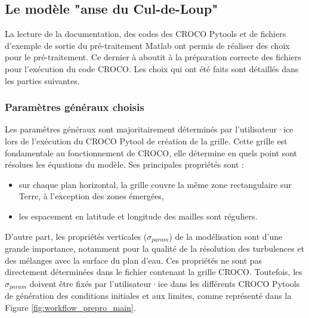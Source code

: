 \documentclass[10pt,a4paper,titlepage]{article}
\begin{document}

\subsection{Le modèle "anse du Cul-de-Loup"}
\label{sub:modele_ADCL}




La lecture de la documentation, des codes des CROCO Pytools et de fichiers d'exemple de sortie du pré-traitement Matlab ont permis de réaliser des choix pour le pré-traitement.
Ce dernier à aboutit à la préparation correcte des fichiers pour l'exécution du code CROCO.
Les choix qui ont été faits sont détaillés dans les parties suivantes.


\subsubsection{Paramètres généraux choisis}
\label{subsub:param_generaux}

Les paramètres généraux sont majoritairement déterminés par l'utilisateur·ice lors de l'exécution du CROCO Pytool de création de la grille.
Cette grille est fondamentale au fonctionnement de CROCO, elle détermine en quels point sont résolues les équations du modèle. Ses principales propriétés sont :

\begin{itemize}
    \item sur chaque plan horizontal, la grille couvre la même zone rectangulaire sur Terre, à l'exception des zones émergées,
    \item les espacement en latitude et longitude des mailles sont réguliers.
\end{itemize}

D'autre part, les propriétés verticales ($\sigma_{param}$) de la modélisation sont d'une grande importance, notamment pour la qualité de la résolution des turbulences et des mélanges avec la surface du plan d'eau.
Ces propriétés ne sont pas directement déterminées dans le fichier contenant la grille CROCO.
Toutefois, les $\sigma_{param}$ doivent être fixés par l'utilisateur·ice dans les différents CROCO Pytools de génération des conditions initiales et aux limites, comme représenté dans la Figure \ref{fig:workflow_prepro_main}.
\end{document}
